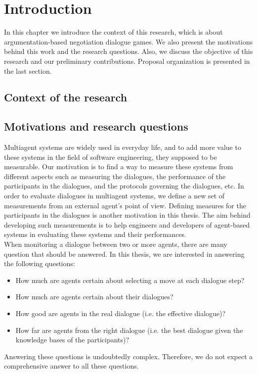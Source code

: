 \setcounter{chapter}{0}
\chapter{Introduction}\label{sec:intro}
In this chapter we introduce the context of this research, which is about argumentation-based negotiation dialogue games. We also present the motivations behind this work and the research questions. Also, we discuss the objective of this research and our preliminary contributions. Proposal organization is presented in the last section.

\section{Context of the research}\label{sec:context}


\section{Motivations and research questions}\label{sec:motivation}

Multiagent systems are widely used in everyday life, and to add more value to these systems in the field of software engineering,
they supposed to be measurable. Our motivation is to find a way to measure these systems from different aspects such as measuring
the dialogues, the performance of the participants in the dialogues, and the protocols governing the dialogues, etc. In order to evaluate
dialogues in multiagent systems, we define a new set of measurements from an external agent's point of view. Defining measures for the
participants in the dialogues is another motivation in this thesis. The aim behind developing such measurements is to help engineers and
developers of agent-based systems in evaluating these systems and their performances.\\

\indent When monitoring a dialogue between two or more agents, there are many question that should be answered. In this thesis, we are interested in answering the following questions:

\begin{itemize}
\item How much are agents certain about selecting a move at each dialogue step?
\item How much are agents certain about their dialogues?
\item How good are agents in the real dialogue (i.e. the effective dialogue)?
\item How far are agents from the right dialogue (i.e. the best dialogue given the knowledge bases of the participants)?
\end{itemize}
Answering these questions is undoubtedly complex. Therefore, we do not expect a comprehensive answer to all these questions.



